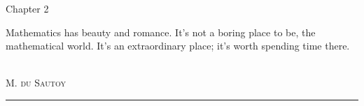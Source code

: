 \begin{titlepage}
\noindent
\titlefont Chapter 2\par
\epigraph{Mathematics has beauty and romance. It's not a boring place to be, the mathematical world. It's an extraordinary place; it's worth spending time there.}%
{\textit{}\\ \textsc{M. du Sautoy}}
\null\vfill
\vspace*{1cm}
\noindent
\hfill
\begin{minipage}{0.35\linewidth}
    \begin{flushright}
        \printauthor
    \end{flushright}
\end{minipage}
%
\begin{minipage}{0.02\linewidth}
    \rule{1pt}{60pt}
\end{minipage}
\titlepagedecoration

\end{titlepage}
